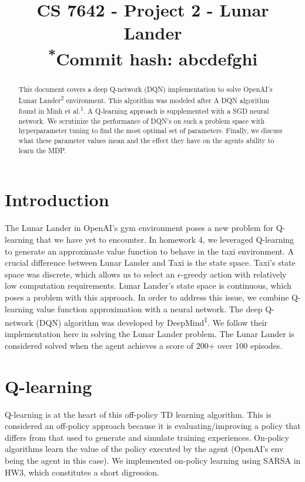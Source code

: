 \documentclass[conference]{IEEEtran}
\begin{document}
\title{
    CS 7642 - Project 2 - Lunar Lander\\
    {\footnotesize \textsuperscript{*}Commit hash: abcdefghi}
}

\author{
}

\maketitle

\begin{abstract}
This document covers a deep Q-network (DQN) implementation to solve OpenAI's Lunar Lander\textsuperscript{2} environment. This algorithm was modeled after A DQN algorithm found in Minh et al.\textsuperscript{1}. A Q-learning approach is supplemented with a SGD neural network. We scrutinize the performance of DQN's on such a problem space with hyperparameter tuning to find the most optimal set of parameters. Finally, we discuss what these parameter values mean and the effect they have on the agents ability to learn the MDP.
\end{abstract}

\section{Introduction}
The Lunar Lander in OpenAI's gym environment poses a new problem for Q-learning that we have yet to encounter. In homework 4, we leveraged Q-learning to generate an approximate value function to behave in the taxi environment. A crucial difference between Lunar Lander and Taxi is the state space. Taxi's state space was discrete, which allows us to select an $\epsilon$-greedy action with relatively low computation requirements. Lunar Lander's state space is continuous, which poses a problem with this approach. In order to address this issue, we combine Q-learning value function approximation with a neural network. The deep Q-network (DQN) algorithm was developed by DeepMind\textsuperscript{1}. We follow their implementation here in solving the Lunar Lander problem. The Lunar Lander is considered solved when the agent achieves a score of 200+ over 100 episodes.

\section{Q-learning}
Q-learning is at the heart of this off-policy TD learning algorithm. This is considered an off-policy approach because it is evaluating/improving a policy that differs from that used to generate and simulate training experiences. On-policy algorithms learn the value of the policy executed by the agent (OpenAI's env being the agent in this case). We implemented on-policy learning using SARSA in HW3, which constitutes a short digression.
\end{document}

